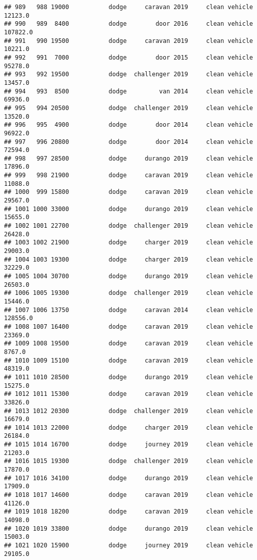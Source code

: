 \documentclass[
]{article}
\begin{document}
\begin{verbatim}
## 989   988 19000           dodge     caravan 2019     clean vehicle   12123.0
## 990   989  8400           dodge        door 2016     clean vehicle  107822.0
## 991   990 19500           dodge     caravan 2019     clean vehicle   10221.0
## 992   991  7000           dodge        door 2015     clean vehicle   95278.0
## 993   992 19500           dodge  challenger 2019     clean vehicle   13457.0
## 994   993  8500           dodge         van 2014     clean vehicle   69936.0
## 995   994 20500           dodge  challenger 2019     clean vehicle   13520.0
## 996   995  4900           dodge        door 2014     clean vehicle   96922.0
## 997   996 20800           dodge        door 2014     clean vehicle   72594.0
## 998   997 28500           dodge     durango 2019     clean vehicle   17896.0
## 999   998 21900           dodge     caravan 2019     clean vehicle   11088.0
## 1000  999 15800           dodge     caravan 2019     clean vehicle   29567.0
## 1001 1000 33000           dodge     durango 2019     clean vehicle   15655.0
## 1002 1001 22700           dodge  challenger 2019     clean vehicle   26428.0
## 1003 1002 21900           dodge     charger 2019     clean vehicle   29003.0
## 1004 1003 19300           dodge     charger 2019     clean vehicle   32229.0
## 1005 1004 30700           dodge     durango 2019     clean vehicle   26503.0
## 1006 1005 19300           dodge  challenger 2019     clean vehicle   15446.0
## 1007 1006 13750           dodge     caravan 2014     clean vehicle  128556.0
## 1008 1007 16400           dodge     caravan 2019     clean vehicle   23369.0
## 1009 1008 19500           dodge     caravan 2019     clean vehicle    8767.0
## 1010 1009 15100           dodge     caravan 2019     clean vehicle   48319.0
## 1011 1010 28500           dodge     durango 2019     clean vehicle   15275.0
## 1012 1011 15300           dodge     caravan 2019     clean vehicle   33826.0
## 1013 1012 20300           dodge  challenger 2019     clean vehicle   16679.0
## 1014 1013 22000           dodge     charger 2019     clean vehicle   26184.0
## 1015 1014 16700           dodge     journey 2019     clean vehicle   21203.0
## 1016 1015 19300           dodge  challenger 2019     clean vehicle   17870.0
## 1017 1016 34100           dodge     durango 2019     clean vehicle   17909.0
## 1018 1017 14600           dodge     caravan 2019     clean vehicle   41126.0
## 1019 1018 18200           dodge     caravan 2019     clean vehicle   14098.0
## 1020 1019 33800           dodge     durango 2019     clean vehicle   15003.0
## 1021 1020 15900           dodge     journey 2019     clean vehicle   29105.0

\end{verbatim}
\end{document}
